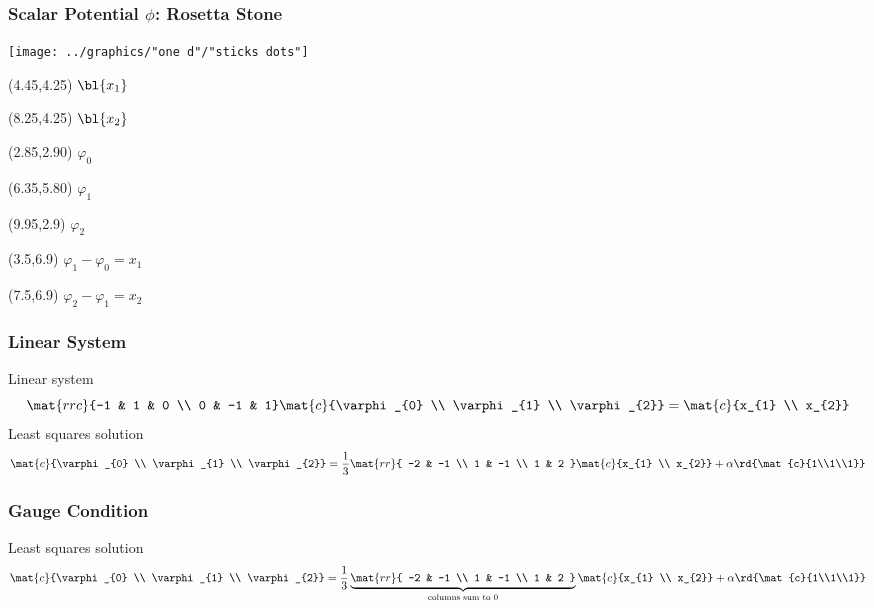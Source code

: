 \documentclass[]{beamer}
\begin{document}
\begin{frame}      %
\frametitle{Scalar Potential $\phi$: Rosetta Stone}
  \begin{center}
    \texttt{[image: ../graphics/"one d"/"sticks dots"]}
  \end{center}
  \begin{textblock}{2.75}(4.45,4.25)
    $\bl{x_{1}}$
  \end{textblock}
  \begin{textblock}{2.75}(8.25,4.25)
    $\bl{x_{2}}$
  \end{textblock}
  \begin{textblock}{2.75}(2.85,2.90)
    $\varphi_{0}$
  \end{textblock}
  \begin{textblock}{2.75}(6.35,5.80)
    $\varphi_{1}$
  \end{textblock}
  \begin{textblock}{2.75}(9.95,2.9)
    $\varphi_{2}$
  \end{textblock}
  \begin{textblock}{2.75}(3.5,6.9)
    $\varphi_{1} - \varphi_{0} = x_{1}$
  \end{textblock}
  \begin{textblock}{2.75}(7.5,6.9)
    $\varphi_{2} - \varphi_{1} = x_{2}$
  \end{textblock}
\end{frame}

\begin{frame}      %
\frametitle{Linear System}
  Linear system
  $$\mat{rrc}{-1 & 1 & 0 \\ 0 & -1 & 1}\mat{c}{\varphi_{0} \\ \varphi_{1} \\ \varphi_{2}} = \mat{c}{x_{1} \\ x_{2}}$$
  \bdoton
  \pause
  Least squares solution
  $$\mat{c}{\varphi_{0} \\ \varphi_{1} \\ \varphi_{2}} = \frac{1}{3} \mat{rr}{ -2 & -1 \\ 1 & -1 \\ 1 & 2 } \mat{c}{x_{1} \\ x_{2}} + \alpha \rd{\mat{c}{1\\1\\1}}$$
\end{frame}

\begin{frame}      %
\frametitle{Gauge Condition}
    Least squares solution
  $$\mat{c}{\varphi_{0} \\ \varphi_{1} \\ \varphi_{2}} = \frac{1}{3} 
  \underbrace{\mat{rr}{ -2 & -1 \\ 1 & -1 \\ 1 & 2 }}_{\text{columns sum to } 0} \mat{c}{x_{1} \\ x_{2}} + \alpha 
  				\rd{\mat{c}{1\\1\\1}}$$
\end{frame}
\end{document}
